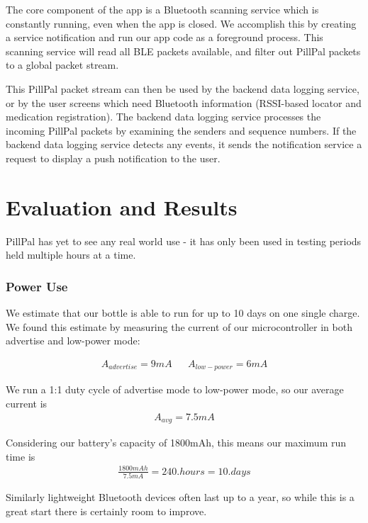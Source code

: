 \documentclass[sigconf]{acmart}
\begin{document}
The core component of the app is a Bluetooth scanning service which is constantly running, even when the app is closed. We accomplish this by creating a service notification and run our app code as a foreground process. This scanning service will read all BLE packets available, and filter out PillPal packets to a global packet stream.

This PillPal packet stream can then be used by the backend data logging service, or by the user screens which need Bluetooth information (RSSI-based locator and medication registration). The backend data logging service processes the incoming PillPal packets by examining the senders and sequence numbers. If the backend data logging service detects any events, it sends the notification service a request to display a push notification to the user.

\section{Evaluation and Results}
PillPal has yet to see any real world use - it has only been used in testing periods held multiple hours at a time.

\subsubsection{Power Use}
\label{sec:power_calc}
We estimate that our bottle is able to run for up to 10 days on one single charge. We found this estimate by measuring the current of our microcontroller in both advertise and low-power mode:

\begin{align*}
  A_{advertise} = 9mA && A_{low-power} = 6mA
\end{align*}

We run a 1:1 duty cycle of advertise mode to low-power mode, so our average current is
\begin{align*}
  A_{avg} = 7.5mA
\end{align*}

Considering our battery's capacity of 1800mAh, this means our maximum run time is
\begin{align*}
  \frac{1800mAh}{7.5mA} = 240. hours = 10. days
\end{align*}

Similarly lightweight Bluetooth devices often last up to a year, so while this is a great start there is certainly room to improve.
\end{document}
